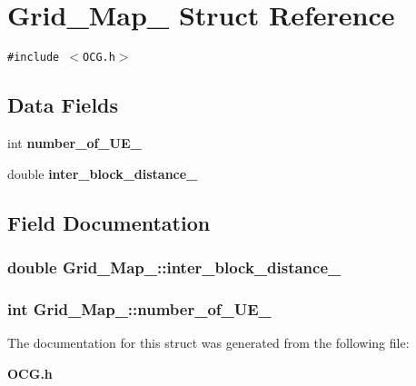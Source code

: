 \section{Grid\_\-Map\_\- Struct Reference}
\label{structGrid__Map__}
{\tt \#include $<$OCG.h$>$}

\subsection*{Data Fields}
\begin{CompactItemize}
\item 
int {\bf number\_\-of\_\-UE\_\-}
\item 
double {\bf inter\_\-block\_\-distance\_\-}
\end{CompactItemize}


\subsection{Field Documentation}
\subsubsection[{inter\_\-block\_\-distance\_\-}]{\setlength{\rightskip}{0pt plus 5cm}double {\bf Grid\_\-Map\_\-::inter\_\-block\_\-distance\_\-}}\label{structGrid__Map___0844a276dd9371e833a0ebcce8be4afc}


\subsubsection[{number\_\-of\_\-UE\_\-}]{\setlength{\rightskip}{0pt plus 5cm}int {\bf Grid\_\-Map\_\-::number\_\-of\_\-UE\_\-}}\label{structGrid__Map___dea39ed7c442cb47647330c25e2dca6c}




The documentation for this struct was generated from the following file:\begin{CompactItemize}
\item 
{\bf OCG.h}\end{CompactItemize}
